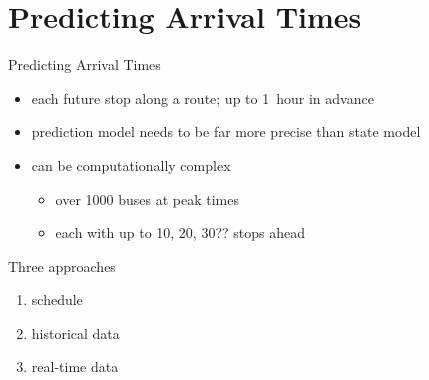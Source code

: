\documentclass[10pt,t]{beamer}
\begin{document}
{ %
    \begin{frame}[plain]
     \end{frame}
}



\section{Predicting Arrival Times}

\begin{frame}{Predicting Arrival Times}
  \begin{itemize}
  \item each future stop along a route; up to 1~hour in advance
  \item prediction model needs to be far more precise than state model
  \item can be computationally complex
    \begin{itemize}
    \item over 1000 buses at peak times
    \item each with up to 10, 20, 30?? stops ahead
    \end{itemize}
  \end{itemize}

  \begin{exampleblock}{Three approaches}
    \begin{enumerate}
    \item schedule
      
    \item historical data
      
    \item real-time data
    \end{enumerate}
  \end{exampleblock}
\end{frame}
\end{document}

